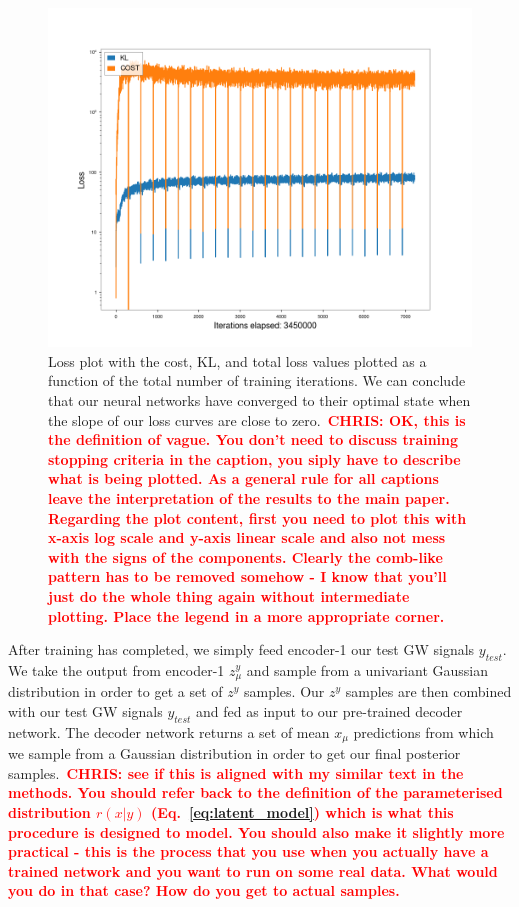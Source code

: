 \documentclass[%
showpacs,
 amsmath,amssymb,
 aps,
 twocolumn,
 prl,
 reprint,
floatfix,
]{revtex4-1}
\newcommand{\chris}[1]{\textbf{\textcolor{red}{CHRIS: #1}}}
\begin{document}
%
%
\begin{figure}
    \includegraphics[width=\columnwidth]{images/losses_logscale.png}
    \caption{\label{fig:loss_log} Loss plot with the cost, KL, and total loss
values plotted as a function of the total number of training iterations. We can
conclude that our neural networks have converged to their optimal state when
the slope of our loss curves are close to zero.~\chris{OK, this is the
definition of vague. You don't need to discuss training stopping criteria in
the caption, you siply have to describe what is being plotted. As a general
rule for all captions leave the interpretation of the results to the main
paper. Regarding the plot content, first you need to plot this with x-axis log
scale and y-axis linear scale and also not mess with the signs of the
components. Clearly the comb-like pattern has to be removed somehow - I know
that you'll just do the whole thing again without intermediate plotting. Place
the legend in a more appropriate corner.}} 
\end{figure}

%
%
After training has completed, we simply feed encoder-1 our test GW signals
$y_{test}$. We take the output from encoder-1 $z^{y}_{\mu}$ and sample from a
univariant Gaussian distribution in order to get a set of $z^{y}$ samples. Our
$z^{y}$ samples are then combined with our test GW signals $y_{test}$ and fed
as input to our pre-trained decoder network. The decoder network returns a set
of mean $x_{\mu}$ predictions from which we sample from a Gaussian distribution
in order to get our final posterior samples.~\chris{see if this is aligned with
my similar text in the methods. You should refer back to the definition of the
parameterised distribution $r(x|y)$ (Eq.~\ref{eq:latent_model}) which is what
this procedure is designed to model. You should also make it slightly more
practical - this is the process that you use when you actually have a trained
network and you want to run on some real data. What would you do in that case?
How do you get to actual samples.}
\end{document}
